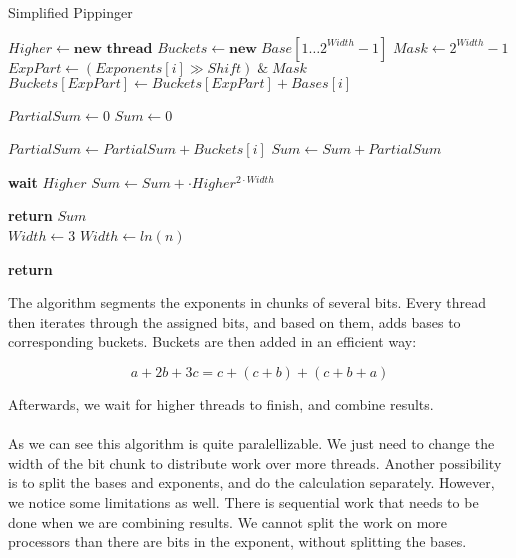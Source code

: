 \begin{algorithm}
\caption{Simplified Pippinger}\label{multiexp}
\begin{algorithmic}[1]

        \State $Higher \gets \textbf{new thread}$ 
    \EndIf
    \State $Buckets \gets \textbf{new} \; Base[1\dots2^{Width}-1]$
    \State $Mask \gets 2^{Width}-1$
        \State $ExpPart \gets (Exponents[i] \gg Shift) \; \&  \;Mask$
            \State $Buckets[ExpPart] \gets Buckets[ExpPart] + Bases[i]$
        \EndIf
    \EndFor
    
    \State $PartialSum \gets 0$
    \State $Sum \gets 0$
    
        \State $PartialSum \gets PartialSum + Buckets[i]$
        \State $Sum \gets Sum + PartialSum$
    \EndFor
    
        \State \textbf{wait} $Higher$
        \State $Sum \gets Sum + \cdot Higher^{2 \cdot Width}$ 
    \EndIf
    
    \State \textbf{return} $Sum$
\EndFunction
\\
        \State $Width \gets 3$
    \Else
        \State $Width \gets ln(n)$
    \EndIf

    \State \textbf{return} 
    
\EndFunction
\end{algorithmic}
\end{algorithm}

The algorithm segments the exponents in chunks of several bits. Every thread then iterates through the assigned bits, and based on them, adds bases to corresponding buckets. Buckets are then added in an efficient way:

$$ a + 2b + 3c = c + (c + b) + (c + b + a) $$

Afterwards, we wait for higher threads to finish, and combine results.\\
\\
As we can see this algorithm is quite paralellizable. We just need to change the width of the bit chunk to distribute work over more threads. Another possibility is to split the bases and exponents, and do the calculation separately. However, we notice some limitations as well. There is sequential work that needs to be done when we are combining results. We cannot split the work on more processors than there are bits in the exponent, without splitting the bases.
\\
